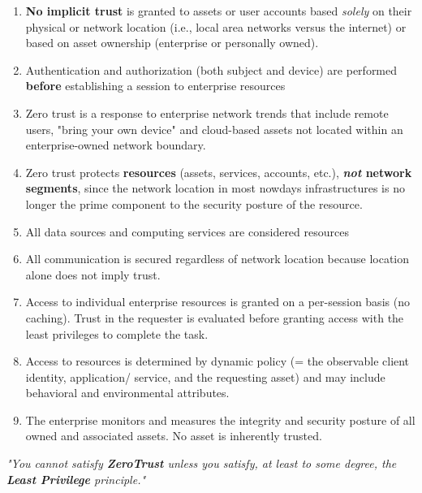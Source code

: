 \begin{enumerate}
   \item \textbf{No implicit trust} is granted to assets or user accounts based
   \textit{solely} on their physical or network location (i.e., local area networks versus the internet) or based on asset ownership
   (enterprise or personally owned).
   \item Authentication and authorization (both subject and device) are
   performed \textbf{before} establishing a session to enterprise resources
   \item Zero trust is a response to enterprise network trends that include remote users, "bring your own device" and cloud-based assets
   not located within an enterprise-owned network boundary.
   \item Zero trust protects \textbf{resources} (assets, services, accounts, etc.), \textbf{\textit{not} network segments},
   since the network location in most nowdays infrastructures is no longer the
   prime component to the security posture of the resource.

   \item All data sources and computing services are considered resources
   \item All communication is secured regardless of network location because
   location alone does not imply trust.
   \item Access to individual enterprise resources is granted on a per-session
   basis (no caching). Trust in the requester is evaluated before granting
   access with the least privileges to complete the task.
   \item Access to resources is determined by dynamic policy (= the
   observable client identity, application/ service, and the requesting
   asset) and may include behavioral and environmental attributes.
   \item The enterprise monitors and measures the integrity and security
   posture of all owned and associated assets. No asset is inherently
   trusted.
\end{enumerate}


\begin{center}
   \textit{"You cannot satisfy \textbf{ZeroTrust} unless you satisfy, at least to some degree, the \textbf{Least Privilege} principle."}
\end{center}